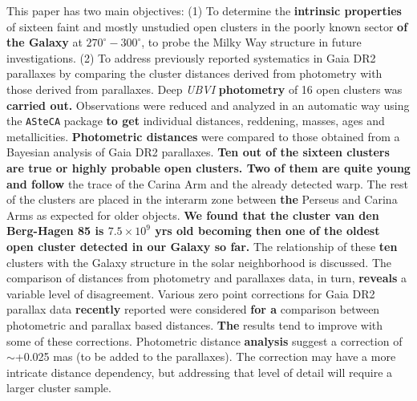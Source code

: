 \documentclass[referee]{aa}
\begin{document}
\abstract
{}
{This paper has two main objectives:
(1) To determine the \textbf{intrinsic properties} of sixteen faint and mostly
unstudied open clusters in the poorly known sector
\textbf{of the Galaxy} at $270^\circ-300^\circ$, to probe the Milky Way
structure in future investigations.
(2) To address previously reported systematics in Gaia DR2 parallaxes by
comparing the cluster distances derived from photometry with
those derived from parallaxes.
}
%
{Deep \textit{UBVI} \textbf{photometry} of 16 open clusters was \textbf{carried out.}
Observations were reduced and analyzed in an automatic way using the 
\texttt{ASteCA} package \textbf{to get} individual distances, reddening,
masses, ages and metallicities. \textbf{Photometric distances} were compared to
those obtained from a Bayesian analysis of Gaia DR2 parallaxes.
}
%
{\textbf{Ten out of the sixteen clusters are true or highly probable open
clusters. Two of them are quite young and follow} the trace of the Carina Arm
and the already detected warp.
The rest of the clusters are placed in the interarm zone between \textbf{the}
Perseus and Carina Arms as expected for older objects.
\textbf{We found that the cluster van den Berg-Hagen 85 is $7.5\times10^9$ yrs
old becoming then one of the oldest open cluster detected in our Galaxy so
far.}
%
The relationship of these \textbf{ten} clusters with the Galaxy structure in
the solar neighborhood is discussed.
The comparison of distances from photometry and parallaxes data, in turn,
\textbf{reveals} a variable level of disagreement.
}
%
{
Various zero point corrections for Gaia DR2 parallax data \textbf{recently}
reported were considered \textbf{for a} comparison between photometric and
parallax based distances.
\textbf{The} results tend to improve with some of these corrections. 
Photometric distance \textbf{analysis} suggest a correction of
$\sim$+0.025 mas (to be added to the parallaxes).
%
The correction may have a more intricate distance dependency, but addressing
that level of detail will require a larger cluster sample.
}


\maketitle
\end{document}

